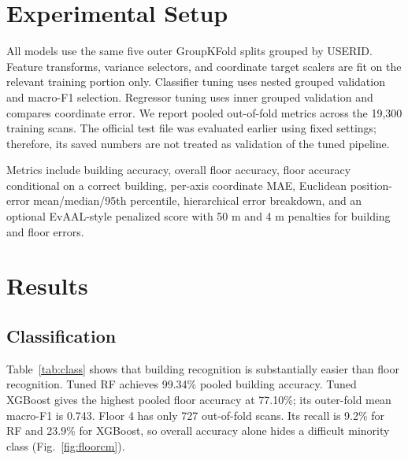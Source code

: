 \documentclass[conference]{IEEEtran}
\begin{document}
\section{Experimental Setup}
All models use the same five outer GroupKFold splits grouped by USERID. Feature transforms, variance selectors, and coordinate target scalers are fit on the relevant training portion only. Classifier tuning uses nested grouped validation and macro-F1 selection. Regressor tuning uses inner grouped validation and compares coordinate error. We report pooled out-of-fold metrics across the 19,300 training scans. The official test file was evaluated earlier using fixed settings; therefore, its saved numbers are not treated as validation of the tuned pipeline.

Metrics include building accuracy, overall floor accuracy, floor accuracy conditional on a correct building, per-axis coordinate MAE, Euclidean position-error mean/median/95th percentile, hierarchical error breakdown, and an optional EvAAL-style penalized score with 50 m and 4 m penalties for building and floor errors.

\section{Results}
\subsection{Classification}
Table~\ref{tab:class} shows that building recognition is substantially easier than floor recognition. Tuned RF achieves 99.34\% pooled building accuracy. Tuned XGBoost gives the highest pooled floor accuracy at 77.10\%; its outer-fold mean macro-F1 is 0.743. Floor 4 has only 727 out-of-fold scans. Its recall is 9.2\% for RF and 23.9\% for XGBoost, so overall accuracy alone hides a difficult minority class (Fig.~\ref{fig:floorcm}).

\begin{table}[t]
\caption{Tuned classifier pooled out-of-fold results}
\label{tab:class}
\centering
\footnotesize
{}
\end{table}
\end{document}
